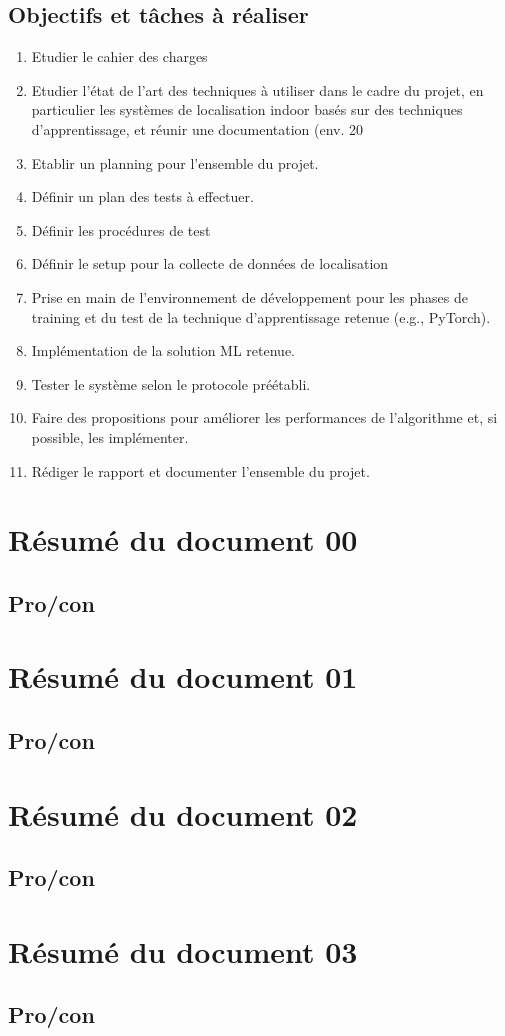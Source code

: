 \subsection{Objectifs et tâches à réaliser}
\begin{enumerate}
	\item Etudier le cahier des charges
	\item Etudier l’état de l’art des techniques à utiliser dans le cadre du projet, en particulier les systèmes de localisation indoor basés sur des techniques d’apprentissage, et réunir une documentation (env. 20%
	\item Etablir un planning pour l’ensemble du projet.
	\item Définir un plan des tests à effectuer.
	\item Définir les procédures de test
	\item Définir le setup pour la collecte de données de localisation
	\item Prise en main de l’environnement de développement pour les phases de training et du test de la technique d’apprentissage retenue (e.g., PyTorch).
	\item Implémentation de la solution ML retenue.
	\item Tester le système selon le protocole préétabli.
	\item Faire des propositions pour améliorer les performances de l’algorithme et, si possible, les implémenter.
	\item Rédiger le rapport et documenter l’ensemble du projet.
\end{enumerate}


\section{Résumé du document 00}
\subsection{Pro/con}

\section{Résumé du document 01}
\subsection{Pro/con}

\section{Résumé du document 02}
\subsection{Pro/con}

\section{Résumé du document 03}
\subsection{Pro/con}